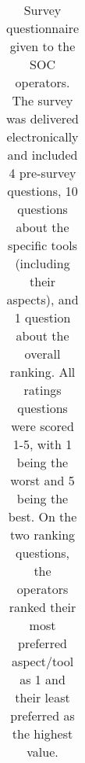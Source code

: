 \begin{center}
\begin{table}
\begin{tabular}{  m{1.85cm}  m{2.5cm} m{8cm}  }
  \bottomrule
  \end{tabular}
  \captionsetup{font = scriptsize}
  \caption{\label{tab:Survey}Survey questionnaire given to the SOC operators. The survey was delivered electronically and included 4 pre-survey questions, 10 questions about the specific tools (including their aspects), and 1 question about the overall ranking. All ratings questions were scored 1-5, with 1 being the worst and 5 being the best. On the two ranking questions, the operators ranked their most preferred aspect/tool as 1 and their least preferred as the highest value.}
  \end{table}
\end{center}





